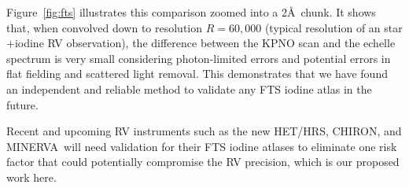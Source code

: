 \documentclass[12pt]{article}
\def\minerva{MINERVA}
\def\hrs{HET/HRS}
\begin{document}
Figure~\ref{fig:fts} illustrates this comparison zoomed into a
2\AA\ chunk. It shows that, when convolved down to resolution
$R=60,000$ (typical resolution of an star$+$iodine RV observation),
the difference between the KPNO scan and the echelle spectrum is very
small considering photon-limited errors and potential errors in flat
fielding and scattered light removal. This demonstrates that we have
found an independent and reliable method to validate any FTS iodine
atlas in the future.

Recent and upcoming RV instruments such as the new \hrs, CHIRON, and
\minerva\ will need validation for their FTS iodine atlases to
eliminate one risk factor that could potentially compromise the RV
precision, which is our proposed work here.

 
\vspace{-3pt}
\end{document}

